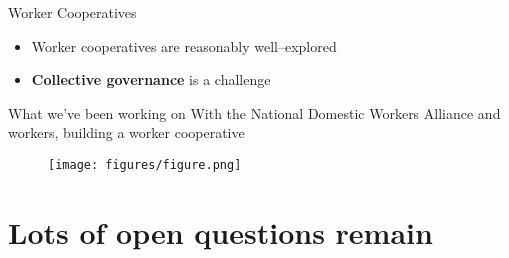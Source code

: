 \documentclass{beamer}
\begin{document}

\begin{frame}{Worker Cooperatives}
  \begin{itemize}[<+- | alert@+>]
    \item Worker cooperatives are reasonably well--explored
      \cite{craig1992behavior,mellor1988worker}
    \item \textbf{Collective governance} is a challenge
      \cite{russell1982collective,ostrom1990governing,polletta2002freedom}
  \end{itemize}
\end{frame}


\begin{frame}{What we've been working on}
    With the National Domestic Workers Alliance and workers,
    building a worker cooperative
  \begin{figure}
    \texttt{[image: figures/figure.png]}  
  \end{figure}
\end{frame}


\section{Lots of open questions remain}

\end{document}
